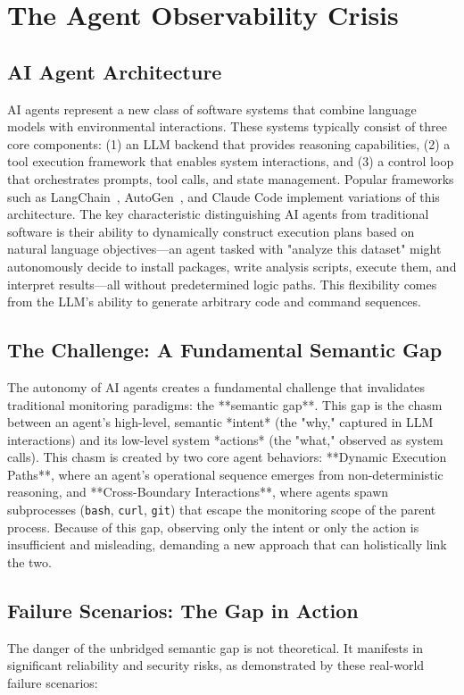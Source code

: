 \section{The Agent Observability Crisis}

\subsection{AI Agent Architecture}
AI agents represent a new class of software systems that combine language models with environmental interactions. These systems typically consist of three core components: (1) an LLM backend that provides reasoning capabilities, (2) a tool execution framework that enables system interactions, and (3) a control loop that orchestrates prompts, tool calls, and state management. Popular frameworks such as LangChain~\cite{langchain}, AutoGen~\cite{autogen}, and Claude Code implement variations of this architecture. The key characteristic distinguishing AI agents from traditional software is their ability to dynamically construct execution plans based on natural language objectives—an agent tasked with "analyze this dataset" might autonomously decide to install packages, write analysis scripts, execute them, and interpret results—all without predetermined logic paths. This flexibility comes from the LLM's ability to generate arbitrary code and command sequences.

\subsection{The Challenge: A Fundamental Semantic Gap}
The autonomy of AI agents creates a fundamental challenge that invalidates traditional monitoring paradigms: the **semantic gap**. This gap is the chasm between an agent's high-level, semantic *intent* (the "why," captured in LLM interactions) and its low-level system *actions* (the "what," observed as system calls). This chasm is created by two core agent behaviors: **Dynamic Execution Paths**, where an agent's operational sequence emerges from non-deterministic reasoning, and **Cross-Boundary Interactions**, where agents spawn subprocesses (\texttt{bash}, \texttt{curl}, \texttt{git}) that escape the monitoring scope of the parent process. Because of this gap, observing only the intent or only the action is insufficient and misleading, demanding a new approach that can holistically link the two.

\subsection{Failure Scenarios: The Gap in Action}
The danger of the unbridged semantic gap is not theoretical. It manifests in significant reliability and security risks, as demonstrated by these real-world failure scenarios:

